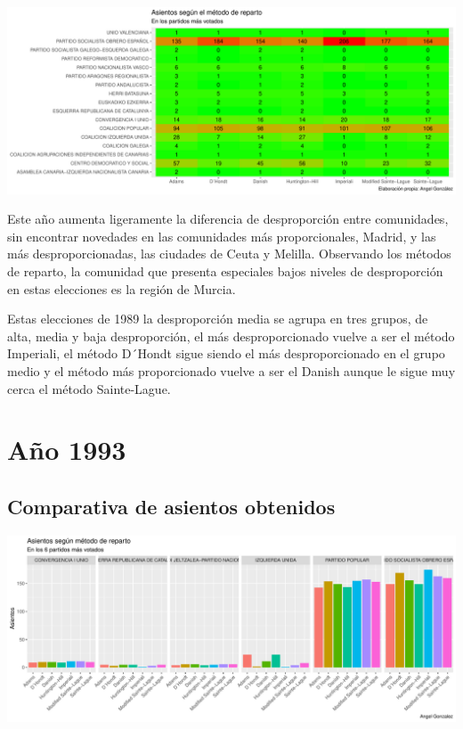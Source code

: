 \documentclass[12pt,a4paper,]{book}
\numberwithin{dummy}{section}
\theoremstyle{ocrenumbox}
\theoremstyle{blacknumex}
\theoremstyle{blacknumbox}
\theoremstyle{ocrenum}
\theoremstyle{ocrenum}
\begin{document}
\begin{center}\includegraphics[width=1\linewidth]{figurasR/unnamed-chunk-89-2} \end{center}

Este año aumenta ligeramente la diferencia de desproporción entre
comunidades, sin encontrar novedades en las comunidades más
proporcionales, Madrid, y las más desproporcionadas, las ciudades de
Ceuta y Melilla. Observando los métodos de reparto, la comunidad que
presenta especiales bajos niveles de desproporción en estas elecciones
es la región de Murcia.

Estas elecciones de 1989 la desproporción media se agrupa en tres
grupos, de alta, media y baja desproporción, el más desproporcionado
vuelve a ser el método Imperiali, el método D´Hondt sigue siendo el más
desproporcionado en el grupo medio y el método más proporcionado vuelve
a ser el Danish aunque le sigue muy cerca el método Sainte-Lague.

\hypertarget{auxf1o-1993}{%
\section{Año 1993}\label{auxf1o-1993}}

\hypertarget{comparativa-de-asientos-obtenidos-5}{%
\subsection{Comparativa de asientos
obtenidos}\label{comparativa-de-asientos-obtenidos-5}}

\begin{center}\includegraphics[width=1\linewidth]{figurasR/unnamed-chunk-91-1} \end{center}
\end{document}
